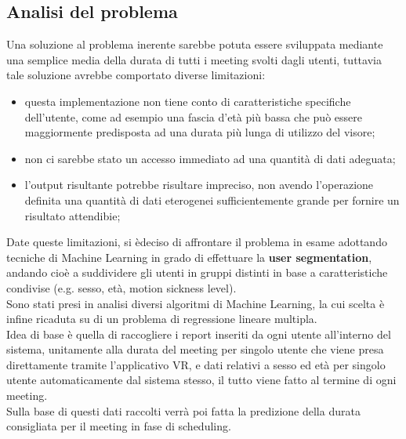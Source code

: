 \subsection{Analisi del problema}
\fancyhead{}    %
\label{paragrafo 1.3}
\par{
Una soluzione al problema inerente sarebbe potuta essere sviluppata mediante una semplice media della durata di tutti i meeting svolti dagli utenti, tuttavia tale soluzione avrebbe comportato diverse limitazioni:
\begin{itemize}
    \item questa implementazione non tiene conto di caratteristiche specifiche dell'utente, come ad esempio una fascia d'età più bassa che può essere maggiormente predisposta ad una durata più lunga di utilizzo del visore;
    \item non ci sarebbe stato un accesso immediato ad una quantità di dati adeguata;
    \item l'output risultante potrebbe risultare impreciso, non avendo l'operazione definita una quantità di dati eterogenei sufficientemente grande per fornire un risultato attendibie;
\end{itemize}
Date queste limitazioni, si èdeciso di affrontare il problema in esame adottando tecniche di Machine Learning in grado di effettuare la \textbf{user segmentation}, andando cioè a suddividere gli utenti in gruppi distinti in base a caratteristiche condivise (e.g. sesso, età, motion sickness level).\\
Sono stati presi in analisi diversi algoritmi di Machine Learning, la cui scelta è infine ricaduta su di un problema di regressione lineare multipla.\\
Idea di base è quella di raccogliere i report inseriti da ogni utente all'interno del sistema, unitamente alla durata del meeting per singolo utente che viene presa direttamente tramite l'applicativo VR, e dati relativi a sesso ed età per singolo utente automaticamente dal sistema stesso, il tutto viene fatto al termine di ogni meeting.\\
Sulla base di questi dati raccolti verrà poi fatta la predizione della durata consigliata per il meeting in fase di scheduling.
}